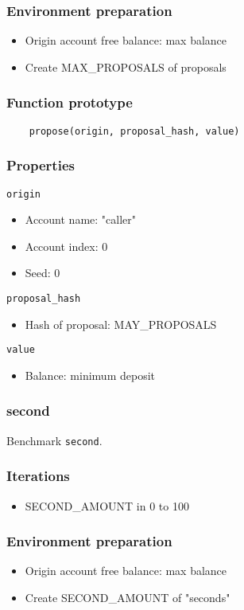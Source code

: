 \documentclass[11pt,a4paper]{article}
\begin{document}
\subsubsection*{Environment preparation}
\begin{itemize}
    \item Origin account free balance: max balance
    \item Create MAX\_PROPOSALS of proposals
\end{itemize}

\subsubsection*{Function prototype}
\begin{verbatim}
    propose(origin, proposal_hash, value)
\end{verbatim}

\subsubsection*{Properties}
\verb|origin|
\begin{itemize}
    \item Account name: "caller"
    \item Account index: 0 
    \item Seed: 0
\end{itemize}
\verb|proposal_hash|
\begin{itemize}
    \item Hash of proposal: MAY\_PROPOSALS
\end{itemize}
\verb|value|
\begin{itemize}
    \item Balance: minimum deposit
\end{itemize}

\subsubsection{second}

Benchmark \verb|second|.

\subsubsection*{Iterations}
\begin{itemize}
    \item SECOND\_AMOUNT in 0 to 100
\end{itemize}

\subsubsection*{Environment preparation}
\begin{itemize}
    \item Origin account free balance: max balance
    \item Create SECOND\_AMOUNT of "seconds"
\end{itemize}
\end{document}

